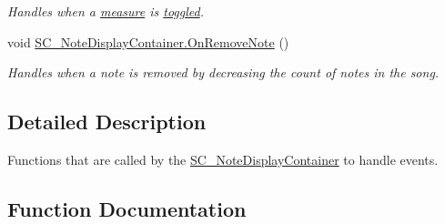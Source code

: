 \begin{DoxyCompactItemize}
\begin{DoxyCompactList}\small\item\em Handles when a \hyperlink{group___doc_s_c___m_d_p}{measure} is \hyperlink{group___s_c___m_d_p_handlers_ga31c72fee5ddd5ae7b057b2f265341263}{toggled}. \end{DoxyCompactList}\item 
void \hyperlink{group___s_c___n_d_c_handlers_ga6dbbf12e55681d13f43e489dd4a100dc}{S\+C\+\_\+\+Note\+Display\+Container.\+On\+Remove\+Note} ()
\begin{DoxyCompactList}\small\item\em Handles when a note is removed by decreasing the count of notes in the song. \end{DoxyCompactList}\end{DoxyCompactItemize}


\subsection{Detailed Description}
Functions that are called by the \hyperlink{class_s_c___note_display_container}{S\+C\+\_\+\+Note\+Display\+Container} to handle events. 

\subsection{Function Documentation}
\mbox{\label{group___s_c___n_d_c_handlers_ga40c5a3b59608c559ab96ad0338c5e042}} 
